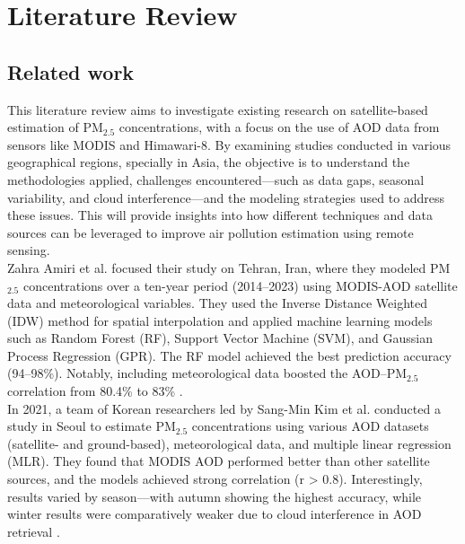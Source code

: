 \documentclass[12pt]{report}
\begin{document}
\chapter{Literature Review}

\section{Related work}


\noindent
This literature review aims to investigate existing research on satellite-based estimation of PM$_{2.5}$ concentrations, with a focus on the use of AOD data from sensors like MODIS and Himawari-8. By examining studies conducted in various geographical regions, specially in Asia, the objective is to understand the methodologies applied, challenges encountered—such as data gaps, seasonal variability, and cloud interference—and the modeling strategies used to address these issues. This will provide insights into how different techniques and data sources can be leveraged to improve air pollution estimation using remote sensing. \\

\noindent Zahra Amiri et al. \cite{iran2025model} focused their study on Tehran, Iran, where they modeled PM$_{2.5}$ concentrations over a ten-year period (2014–2023) using MODIS-AOD satellite data and meteorological variables. They used the Inverse Distance Weighted (IDW) method for spatial interpolation and applied machine learning models such as Random Forest (RF), Support Vector Machine (SVM), and Gaussian Process Regression (GPR). The RF model achieved the best prediction accuracy (94–98\%). Notably, including meteorological data boosted the AOD–PM$_{2.5}$ correlation from 80.4\% to 83\% \cite{iran2025model}.\\

\noindent In 2021, a team of Korean researchers led by Sang-Min Kim et al. \cite{korea} conducted a study in Seoul to estimate PM$_{2.5}$ concentrations using various AOD datasets (satellite- and ground-based), meteorological data, and multiple linear regression (MLR). They found that MODIS AOD performed better than other satellite sources, and the models achieved strong correlation (r > 0.8). Interestingly, results varied by season—with autumn showing the highest accuracy, while winter results were comparatively weaker due to cloud interference in AOD retrieval \cite{korea}.\\
\end{document}
